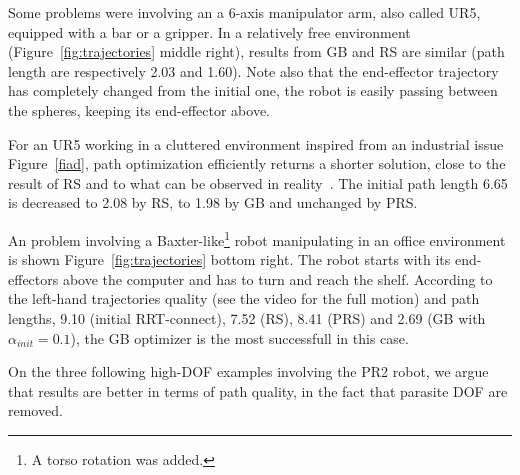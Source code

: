 \documentclass{tADR2e}
\begin{document}
Some problems were 
involving an a 6-axis manipulator arm, also called UR5, equipped with a bar or a 
gripper.
In a relatively free environment (Figure~\ref{fig:trajectories} middle right), 
results from GB and RS are similar (path length are respectively 2.03 and 1.60). 
Note also that the end-effector trajectory has completely changed from the initial 
one, the robot is easily passing between the spheres, keeping its end-effector 
above.

For an UR5 working in a cluttered environment inspired from an industrial issue 
Figure~\ref{fiad}, path optimization efficiently returns a shorter solution, close 
to the result of RS and to what can be observed in reality~\cite{factory-day-video}. 
The initial path length 6.65 is decreased to 2.08 by RS, to 
1.98 by GB and unchanged by PRS.


An problem involving a Baxter-like\footnote{A torso rotation was added.} robot manipulating in an office environment is shown Figure~\ref{fig:trajectories} bottom right. The robot starts with its end-effectors above the computer and has to turn and reach the shelf. According to the left-hand trajectories quality (see the video for the full motion) and path lengths, 9.10 (initial RRT-connect), 7.52 (RS), 8.41 (PRS) and 2.69 (GB with $\alpha_{init}=0.1$), the GB optimizer is the most successfull in this case.

\vspace{0.4cm}

On the three following high-DOF examples involving the PR2 robot, we argue that 
results are better in terms of path quality, in the fact that parasite DOF are 
removed.
\end{document}
